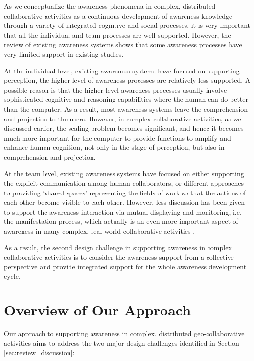 As we conceptualize the awareness phenomena in complex, distributed collaborative activities as a continuous development of awareness knowledge through a variety of integrated cognitive and social processes, it is very important that all the individual and team processes are well supported. However, the review of existing awareness systems shows that some awareness processes have very limited support in existing studies.

At the individual level, existing awareness systems have focused on supporting perception, the higher level of awareness processes are relatively less supported. A possible reason is that the higher-level awareness processes usually involve sophisticated cognitive and reasoning capabilities where the human can do better than the computer. As a result, most awareness systems leave the comprehension and projection to the users. However, in complex collaborative activities, as we discussed earlier, the scaling problem becomes significant, and hence it becomes much more important for the computer to provide functions to amplify and enhance human cognition, not only in the stage of perception, but also in comprehension and projection. 

At the team level, existing awareness systems have focused on either supporting the explicit communication among human collaborators, or different approaches to providing `shared spaces' representing the fields of work so that the actions of each other become visible to each other. However, less discussion has been given to support the awareness interaction via mutual displaying and monitoring, i.e. the manifestation process, which actually is an even more important aspect of awareness in many complex, real world collaborative activities \cite{heath2002a}.

As a result, the second design challenge in supporting awareness in complex collaborative activities is to consider the awareness support from a collective perspective and provide integrated support for the whole awareness development cycle.

\chapter{Overview of Our Approach} %
\label{cha:our_approach_overview}

Our approach to supporting awareness in complex, distributed geo-collaborative activities aims to address the two major design challenges identified in Section \ref{sec:review_discussion}: 

